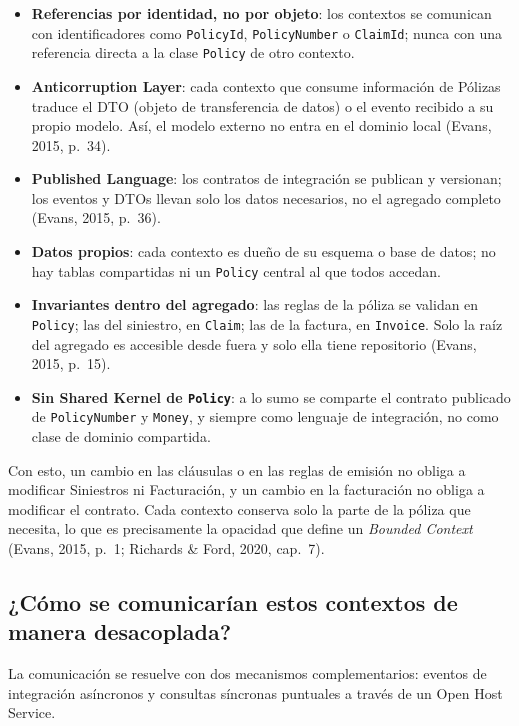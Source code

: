 \documentclass[12pt,a4paper]{article}
\begin{document}
\begin{itemize}[label=$\cdot$]
  \item \textbf{Referencias por identidad, no por objeto}: los contextos se comunican con identificadores como \texttt{PolicyId}, \texttt{PolicyNumber} o \texttt{ClaimId}; nunca con una referencia directa a la clase \texttt{Policy} de otro contexto.
  \item \textbf{Anticorruption Layer}: cada contexto que consume información de Pólizas traduce el DTO (objeto de transferencia de datos) o el evento recibido a su propio modelo. Así, el modelo externo no entra en el dominio local (Evans, 2015, p.~34).
  \item \textbf{Published Language}: los contratos de integración se publican y versionan; los eventos y DTOs llevan solo los datos necesarios, no el agregado completo (Evans, 2015, p.~36).
  \item \textbf{Datos propios}: cada contexto es dueño de su esquema o base de datos; no hay tablas compartidas ni un \texttt{Policy} central al que todos accedan.
  \item \textbf{Invariantes dentro del agregado}: las reglas de la póliza se validan en \texttt{Policy}; las del siniestro, en \texttt{Claim}; las de la factura, en \texttt{Invoice}. Solo la raíz del agregado es accesible desde fuera y solo ella tiene repositorio (Evans, 2015, p.~15).
  \item \textbf{Sin Shared Kernel de \texttt{Policy}}: a lo sumo se comparte el contrato publicado de \texttt{PolicyNumber} y \texttt{Money}, y siempre como lenguaje de integración, no como clase de dominio compartida.
\end{itemize}

Con esto, un cambio en las cláusulas o en las reglas de emisión no obliga a modificar Siniestros ni Facturación, y un cambio en la facturación no obliga a modificar el contrato. Cada contexto conserva solo la parte de la póliza que necesita, lo que es precisamente la opacidad que define un \textit{Bounded Context} (Evans, 2015, p.~1; Richards \& Ford, 2020, cap.~7).

\subsection{¿Cómo se comunicarían estos contextos de manera desacoplada?}

La comunicación se resuelve con dos mecanismos complementarios: eventos de integración asíncronos y consultas síncronas puntuales a través de un Open Host Service.
\end{document}
